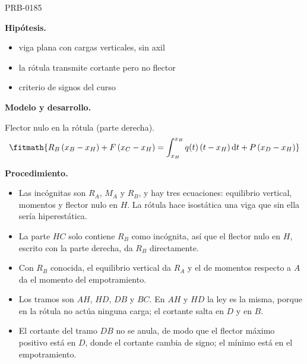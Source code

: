 \begin{studiumworked}{PRB-0185}
\begin{minipage}{\linewidth}
%
\fi
\fi
\endgroup
\par\nopagebreak
{}
\end{minipage}\par\medskip

\textbf{Hipótesis.}\begin{itemize}\item viga plana con cargas verticales, sin axil
\item la rótula transmite cortante pero no flector
\item criterio de signos del curso\end{itemize}

\textbf{Modelo y desarrollo.}

Flector nulo en la rótula (parte derecha).\[\fitmath{R_B\,(x_B - x_H) + F\,(x_C - x_H) = \int_{x_H}^{x_B} q(t)\,(t - x_H)\,\mathrm{d}t + P\,(x_D - x_H)}\]

\textbf{Procedimiento.}\begin{itemize}\item Las incógnitas son $R_A$, $M_A$ y $R_B$, y hay tres ecuaciones: equilibrio vertical, momentos y flector nulo en $H$. La rótula hace isostática una viga que sin ella sería hiperestática.
\item La parte $HC$ solo contiene $R_B$ como incógnita, así que el flector nulo en $H$, escrito con la parte derecha, da $R_B$ directamente.
\item Con $R_B$ conocida, el equilibrio vertical da $R_A$ y el de momentos respecto a $A$ da el momento del empotramiento.
\item Los tramos son $AH$, $HD$, $DB$ y $BC$. En $AH$ y $HD$ la ley es la misma, porque en la rótula no actúa ninguna carga; el cortante salta en $D$ y en $B$.
\item El cortante del tramo $DB$ no se anula, de modo que el flector máximo positivo está en $D$, donde el cortante cambia de signo; el mínimo está en el empotramiento.\end{itemize}


\end{studiumworked}
